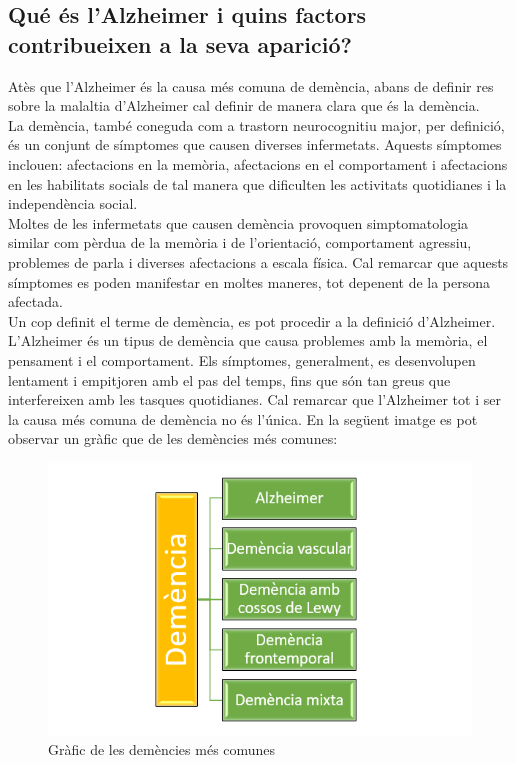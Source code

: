 \documentclass[a4paper,12pt]{article}
\begin{document}
\subsection*{Qué és l'Alzheimer i quins factors contribueixen a la seva aparició?}
Atès que l'Alzheimer és la causa més comuna de demència, abans de definir res sobre la malaltia d'Alzheimer cal definir de manera clara que és la demència.\\
La demència, també coneguda com a trastorn neurocognitiu major, per definició, és un conjunt de símptomes que causen diverses infermetats. Aquests símptomes inclouen: afectacions en la memòria, afectacions en el comportament i afectacions en les habilitats socials de tal manera que dificulten les activitats quotidianes i la independència social.\\
Moltes de les infermetats que causen demència provoquen simptomatologia similar com pèrdua de la memòria i de l'orientació, comportament agressiu, problemes de parla i diverses afectacions a escala física. Cal remarcar que aquests símptomes es poden manifestar en moltes maneres, tot depenent de la persona afectada.\\
Un cop definit el terme de demència, es pot procedir a la definició d'Alzheimer.\\
L'Alzheimer és un tipus de demència que causa problemes amb la memòria, el pensament i el comportament. Els símptomes, generalment, es desenvolupen lentament i empitjoren amb el pas del temps, fins que són tan greus que interfereixen amb les tasques quotidianes. Cal remarcar que l'Alzheimer tot i ser la causa més comuna de demència no és l'única. En la següent imatge es pot observar un gràfic que de les demències més comunes:
\begin{figure}[H]
    \centering
    \includegraphics[scale = 0.5]{images/image_2023-03-08_172829369.png}
    \caption{Gràfic de les demències més comunes}
    \label{fig:demències}
\end{figure}
\end{document}

